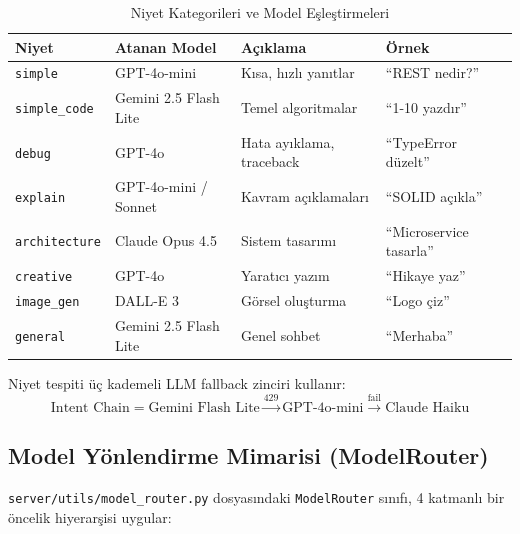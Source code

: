 \documentclass[12pt,a4paper]{article}
\begin{document}
\begin{table}[H]
\centering
\caption{Niyet Kategorileri ve Model Eşleştirmeleri}
\label{tab:intents}
\begin{tabular}{@{}llp{4cm}p{3cm}@{}}
\toprule
    \textbf{Niyet} & \textbf{Atanan Model} & \textbf{Açıklama} & \textbf{Örnek} \\
\midrule
\texttt{simple} & GPT-4o-mini & Kısa, hızlı yanıtlar & ``REST nedir?'' \\
\texttt{simple\_code} & Gemini 2.5 Flash Lite & Temel algoritmalar & ``1-10 yazdır'' \\
\texttt{debug} & GPT-4o & Hata ayıklama, traceback & ``TypeError düzelt'' \\
\texttt{explain} & GPT-4o-mini / Sonnet & Kavram açıklamaları & ``SOLID açıkla'' \\
\texttt{architecture} & Claude Opus 4.5 & Sistem tasarımı & ``Microservice tasarla'' \\
\texttt{creative} & GPT-4o & Yaratıcı yazım & ``Hikaye yaz'' \\
\texttt{image\_gen} & DALL-E 3 & Görsel oluşturma & ``Logo çiz'' \\
\texttt{general} & Gemini 2.5 Flash Lite & Genel sohbet & ``Merhaba'' \\
\bottomrule
\end{tabular}
\end{table}

Niyet tespiti üç kademeli LLM fallback zinciri kullanır:
\begin{equation}
    \text{Intent Chain} = \text{Gemini Flash Lite} \xrightarrow{\text{429}} \text{GPT-4o-mini} \xrightarrow{\text{fail}} \text{Claude Haiku}
\end{equation}

\subsection{Model Yönlendirme Mimarisi (ModelRouter)}
\label{subsec:router}

\texttt{server/utils/model\_router.py} dosyasındaki \texttt{ModelRouter} sınıfı, 4 katmanlı bir öncelik hiyerarşisi uygular:
\end{document}
